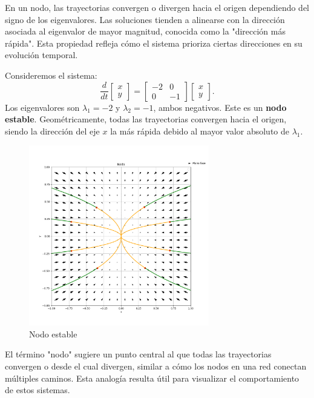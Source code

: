 En un nodo, las trayectorias convergen o divergen hacia el origen dependiendo del signo de los eigenvalores. Las soluciones tienden a alinearse con la dirección asociada al eigenvalor de mayor magnitud, conocida como la "dirección más rápida". Esta propiedad refleja cómo el sistema prioriza ciertas direcciones en su evolución temporal.

\begin{example}
Consideremos el sistema:
\[
\frac{d}{dt} \begin{bmatrix} x \\ y \end{bmatrix} = \begin{bmatrix} -2 & 0 \\ 0 & -1 \end{bmatrix} \begin{bmatrix} x \\ y \end{bmatrix}.
\]
Los eigenvalores son $\lambda_1 = -2$ y $\lambda_2 = -1$, ambos negativos. Este es un \textbf{nodo estable}. Geométricamente, todas las trayectorias convergen hacia el origen, siendo la dirección del eje $x$ la más rápida debido al mayor valor absoluto de $\lambda_1$.
\end{example}

\begin{figure}[h]
    \centering
    \includegraphics[width=0.7\textwidth]{Img/Nodo.png}
    \caption{Nodo estable}
    \label{fig:nodo}
\end{figure}

El término "nodo" sugiere un punto central al que todas las trayectorias convergen o desde el cual divergen, similar a cómo los nodos en una red conectan múltiples caminos. Esta analogía resulta útil para visualizar el comportamiento de estos sistemas.

